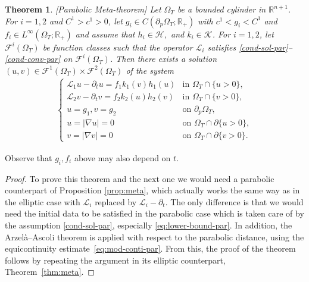 \documentclass[11pt,oneside,english]{amsart}
\newcommand{\R}{{\mathbb R}}
\newcommand{\cL}{{\mathcal L}}
\newcommand{\cF}{{\mathcal F}}
\newcommand{\D}{\nabla}
\numberwithin{equation}{section}
\newtheorem{theorem}{Theorem}
\theoremstyle{plain}
\numberwithin{equation}{section}
\begin{document}
\begin{theorem}\label{thm:meta-par}[Parabolic Meta-theorem]
    Let $\Omega_T$ be a bounded cylinder in $\R^{n+1}$. For $i=1,2$ and $C^1>c^1>0$, let $g_i\in C(\partial_p\Omega_T;\R_+)$ with $c^1<g_i<C^1$ and $f_i\in L^\infty(\Omega_T;\R_+)$ and assume that
$h_i\in\mathcal H,$ and $k_i\in\mathcal K$. For $i=1,2$, let $\mathcal F^i(\Omega_T)$ be function classes such that
the operator $\mathcal L_i$ satisfies
\ref{cond-sol-par}--\ref{cond-conv-par} on $\mathcal F^i(\Omega_T)$.
Then there exists a solution $(u,v)\in \cF^1(\Omega_T)\times \cF^2(\Omega_T)$ of the system
    \begin{align}\label{eq:sol-2-par}
        \begin{cases}
            \cL_1 u-\partial_tu=f_1k_1(v)h_1(u)&\text{in }\Omega_T\cap\{u>0\},\\
            \cL_2 v-\partial_tv=f_2k_2(u)h_2(v)&\text{in }\Omega_T\cap\{v>0\},\\
            u=g_1, v=g_2&\text{on }\partial_p\Omega_T,\\
            u=|\D u|=0&\text{on }\Omega_T\cap\partial\{u>0\},\\
            v=|\D v|=0&\text{on }\Omega_T\cap\partial\{v>0\}.
        \end{cases}
    \end{align}
\end{theorem}


 Observe that $g_i, f_i$ above may also depend on $t$.

\begin{proof} To prove this theorem and the next one we would need  a parabolic counterpart of Proposition \ref{prop:meta}, which actually works the same way as in the elliptic case with $\mathcal{L}_i$ replaced by $\mathcal{L}_i - \partial_t$. The only difference is that we would need the initial data to be satisfied in the parabolic case which is taken care of by the assumption \ref{cond-sol-par}, especially \eqref{eq:lower-bound-par}. 
In addition, the Arzel\`{a}--Ascoli theorem is applied with respect to the parabolic distance, using the equicontinuity estimate~\eqref{eq:mod-conti-par}.
From this, the proof of the theorem  follows by repeating the argument in its elliptic counterpart, Theorem~\ref{thm:meta}. 
\end{proof}


\end{document}
